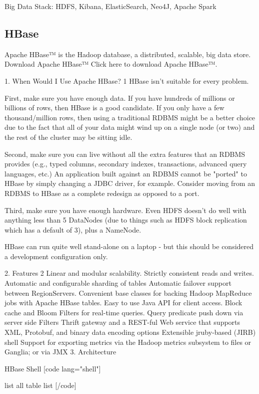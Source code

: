 Big Data Stack: HDFS, Kibana, ElasticSearch, Neo4J, Apache Spark

\subsection{HBase}

Apache HBase™ is the Hadoop database, a distributed, scalable, big data store. Download Apache HBase™ Click here to download Apache HBase™.


1. When Would I Use Apache HBase? 1
HBase isn’t suitable for every problem.

First, make sure you have enough data. If you have hundreds of millions or billions of rows, then HBase is a good candidate. If you only have a few thousand/million rows, then using a traditional RDBMS might be a better choice due to the fact that all of your data might wind up on a single node (or two) and the rest of the cluster may be sitting idle.

Second, make sure you can live without all the extra features that an RDBMS provides (e.g., typed columns, secondary indexes, transactions, advanced query languages, etc.) An application built against an RDBMS cannot be "ported" to HBase by simply changing a JDBC driver, for example. Consider moving from an RDBMS to HBase as a complete redesign as opposed to a port.

Third, make sure you have enough hardware. Even HDFS doesn’t do well with anything less than 5 DataNodes (due to things such as HDFS block replication which has a default of 3), plus a NameNode.

HBase can run quite well stand-alone on a laptop - but this should be considered a development configuration only.

2. Features 2
Linear and modular scalability.
Strictly consistent reads and writes.
Automatic and configurable sharding of tables
Automatic failover support between RegionServers.
Convenient base classes for backing Hadoop MapReduce jobs with Apache HBase tables.
Easy to use Java API for client access.
Block cache and Bloom Filters for real-time queries.
Query predicate push down via server side Filters
Thrift gateway and a REST-ful Web service that supports XML, Protobuf, and binary data encoding options
Extensible jruby-based (JIRB) shell
Support for exporting metrics via the Hadoop metrics subsystem to files or Ganglia; or via JMX
3. Architecture


HBase Shell
[code lang="shell"]

list all table
list [/code]

